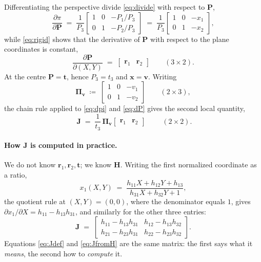 \documentclass[11pt,a4paper]{article}
\theoremstyle{remark}
\newcommand{\Hmat}{\mathbf{H}}
\newcommand{\Jmat}{\mathbf{J}}
\newcommand{\Pimat}{\boldsymbol{\Pi}_{\vvec}}
\newcommand{\Pvec}{\mathbf{P}}
\newcommand{\rvec}{\mathbf{r}}
\newcommand{\tvec}{\mathbf{t}}
\newcommand{\vvec}{\mathbf{v}}
\newcommand{\xvec}{\mathbf{x}}
\begin{document}
Differentiating the perspective divide \eqref{eq:divide} with respect to
$\Pvec$,
\begin{equation}
  \frac{\partial \pi}{\partial \Pvec}
  \;=\; \frac{1}{P_3}
  \begin{bmatrix}
    1 & 0 & -P_1/P_3 \\
    0 & 1 & -P_2/P_3
  \end{bmatrix}
  \;=\; \frac{1}{P_3}
  \begin{bmatrix}
    1 & 0 & -x_1 \\
    0 & 1 & -x_2
  \end{bmatrix},
  \label{eq:dpi}
\end{equation}
while \eqref{eq:rigid} shows that the derivative of $\Pvec$ with respect to the
plane coordinates is constant,
\begin{equation}
  \frac{\partial \Pvec}{\partial (X,Y)}
  \;=\; \begin{bmatrix} \rvec_1 & \rvec_2 \end{bmatrix}
  \qquad (3\times2).
  \label{eq:dP}
\end{equation}
At the centre $\Pvec = \tvec$, hence $P_3 = t_3$ and $\xvec = \vvec$. Writing
\begin{equation}
  \Pimat \;\coloneqq\;
  \begin{bmatrix}
    1 & 0 & -v_1 \\
    0 & 1 & -v_2
  \end{bmatrix}
  \qquad (2\times3),
  \label{eq:pidef}
\end{equation}
the chain rule applied to \eqref{eq:dpi} and \eqref{eq:dP} gives the second
local quantity,
\begin{equation}
  \boxed{\;
  \Jmat \;=\; \frac{1}{t_3}\,\Pimat
  \begin{bmatrix} \rvec_1 & \rvec_2 \end{bmatrix}
  \;}
  \qquad (2\times2).
  \label{eq:Jdef}
\end{equation}

\paragraph{How $\Jmat$ is computed in practice.} We do not know
$\rvec_1,\rvec_2,\tvec$; we know $\Hmat$. Writing the first normalized
coordinate as a ratio,
\begin{equation}
  x_1(X,Y) \;=\;
  \frac{h_{11}X + h_{12}Y + h_{13}}{h_{31}X + h_{32}Y + 1},
\end{equation}
the quotient rule at $(X,Y) = (0,0)$, where the denominator equals $1$, gives
$\partial x_1 / \partial X = h_{11} - h_{13}h_{31}$, and similarly for the other
three entries:
\begin{equation}
  \Jmat \;=\;
  \begin{bmatrix}
    h_{11} - h_{13}h_{31} & h_{12} - h_{13}h_{32} \\
    h_{21} - h_{23}h_{31} & h_{22} - h_{23}h_{32}
  \end{bmatrix}.
  \label{eq:JfromH}
\end{equation}
Equations \eqref{eq:Jdef} and \eqref{eq:JfromH} are the same matrix: the first
says what it \emph{means}, the second how to \emph{compute} it.
\end{document}
